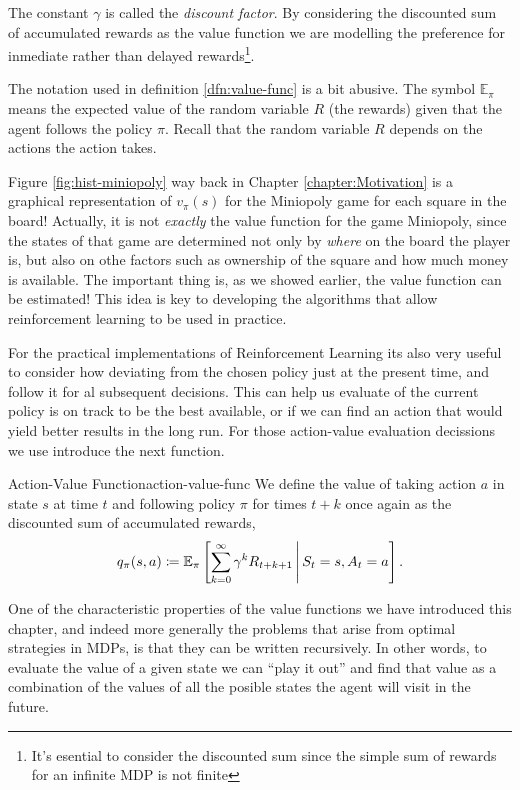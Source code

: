 The constant $\gamma$ is called the \textit{discount factor}. By considering the
discounted sum of accumulated rewards as the value function we are modelling the
preference for inmediate rather than delayed rewards\footnote{It's esential to
consider the discounted sum since the simple sum of rewards for an infinite MDP
is not finite}. 

The notation used in definition \ref{dfn:value-func} is a bit abusive. The
symbol $\mathbb{E}_{\pi}$ means the expected value of the random variable $R$
(the rewards) given that the agent follows the policy $\pi$. Recall that the
random variable $R$ depends on the actions the action takes.

Figure \ref{fig:hist-miniopoly} way back in Chapter \ref{chapter:Motivation} is
a graphical representation of $v_\pi (s)$ for the Miniopoly game for each square
in the board! Actually, it is not \textit{exactly} the value function for the
game Miniopoly, since the states of that game are determined not only by
\textit{where} on the board the player is, but also on othe factors such as
ownership of the square and how much money is available. The important thing is,
as we showed earlier, the value function can be estimated! This idea is key to
developing the algorithms that allow reinforcement learning to be used in
practice.

For the practical implementations of Reinforcement Learning its also very useful
to consider how deviating from the chosen policy just at the present time, and
follow it for al subsequent decisions. This can help us evaluate of the current
policy is on track to be the best available, or if we can find an action that
would yield better results in the long run. For those action-value evaluation decissions we use introduce the next function.

\begin{dfn}{Action-Value Function}{action-value-func}
	We define the value of taking action $a$ in state $s$ at time $t$ and
	following policy $\pi$ for times $t+k$ once again as the discounted sum of
	accumulated rewards,
	\begin{equation*}
		q_\pi (s, a) \coloneqq \mathbb{E}_{\pi} \left[ \sum_{k=0}^{\infty} \gamma^{k} R_{t+k+1} \,\middle\vert\, S_t = s, A_t = a \right].
	\end{equation*}
\end{dfn}

One of the characteristic properties of the value functions we have introduced
this chapter, and indeed more generally the problems that arise from optimal
strategies in MDPs, is that they can be written recursively. In other words, to
evaluate the value of a given state we can ``play it out'' and find that value
as a combination of the values of all the posible states the agent will visit in
the future.

